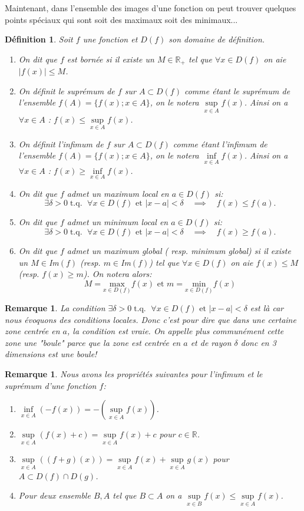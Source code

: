\documentclass[a4paper, 12pt, french, twoside]{article}
\newtheorem{defi}[theorem]{Définition}
\newtheorem{rem}[theorem]{Remarque}
\newcommand{\Rr}{{\mathbb{R}}}
\begin{document}
Maintenant, dans l'ensemble des images d'une fonction on peut trouver quelques points spéciaux qui sont soit des maximaux soit des minimaux...
\begin{defi}
Soit $f$ une fonction et $D(f)$ son domaine de définition. 
\begin{enumerate}
    \item On dit que $f$ est bornée si il existe un $M\in \Rr_+$ tel que $\forall x \in D(f)$ on aie $|f(x)|\leq M $.
    \item On définit le suprémum de $f$ sur $A\subset D(f)$ comme étant le suprémum de l'ensemble $f(A)=\{f(x) ; x\in A\}$, on le notera $\underset{x\in A}{\sup}f(x)$. Ainsi on a $\forall x \in A $ : $f(x) \leq \underset{x\in A}{\sup}f(x)$.
    \item On définit l'infimum de $f$ sur $A\subset D(f)$ comme étant l'infimum de l'ensemble $f(A)=\{f(x) ; x\in A\}$, on le notera $\underset{x\in A}{\inf}f(x)$. Ainsi on a $\forall x \in A $ : $f(x) \geq \underset{x\in A}{\inf}f(x)$.
    \item On dit que  $f$ admet un maximum local en $a\in D(f)$ si: \[\exists \delta >0 \; \text{t.q. } \;\forall x\in D(f) \text{ et } |x-a|<\delta \quad\implies\quad f(x)\leq f(a).\] 
    \item On dit que  $f$ admet un minimum local en $a\in D(f)$ si: \[\exists \delta >0\; \text{t.q. } \;\forall x\in D(f) \text{ et } |x-a|<\delta \quad\implies\quad f(x)\geq f(a).\]
    \item On dit que $f$ admet un maximum global ( resp. minimum global) si il existe un $M\in$Im$(f)$ (resp. $m\in$Im$(f)$) tel que $\forall x \in D(f)$ on aie $f(x)\leq M$ (resp. $f(x)\geq m$). On notera alors: 
    $$M=\underset{x\in D(f)}{\text{max}}f(x) \text{ et } m=\underset{x\in D(f)}{\text{min}}f(x)$$
\end{enumerate}
\end{defi}
\begin{rem}
    La condition $ \exists \delta >0\; \text{t.q. } \;\forall x\in D(f) \text{ et } |x-a|<\delta$ est là car nous évoquons des conditions locales. Donc c'est pour dire que dans une certaine zone centrée en $a$, la condition est vraie. On appelle plus communément cette zone une "boule" parce que la zone est centrée en $a$ et de rayon $\delta$ donc en 3 dimensions est une boule!
\end{rem}
   \begin{rem}
       Nous avons les propriétés suivantes pour l'infimum et le suprémum d'une fonction $f$: 
       \begin{enumerate}
           \item $\underset{x\in A}{\inf}(-f(x))=-(\underset{x\in A}{\sup}f(x))$.
           \item $\underset{x\in A}{\sup}(f(x)+c)=\underset{x\in A}{\sup}f(x)+c$ pour $c\in \Rr$.
           \item $\underset{x\in A}{\sup}((f+g)(x))=\underset{x\in A}{\sup}f(x)+\underset{x\in A}{\sup}g(x)$ pour $A\subset D(f)\cap D(g)$.
           \item Pour deux ensemble $B,A$ tel que $B\subset A $ on a $\underset{x\in B}{\sup}f(x)\leq \underset{x\in A}{\sup}f(x)$.
       \end{enumerate}
   \end{rem}
\end{document}
